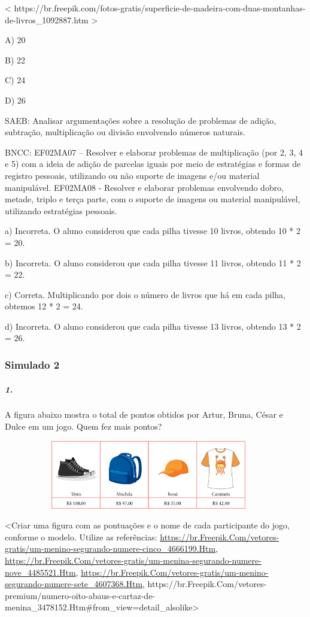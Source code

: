 \textless{}
https://br.freepik.com/fotos-gratis/superficie-de-madeira-com-duas-montanhas-de-livros\_1092887.htm
\textgreater{}

A) 20

B) 22

C) 24

D) 26

SAEB: Analisar argumentações sobre a resolução de problemas de
adição, subtração, multiplicação ou divisão envolvendo números naturais.

BNCC: EF02MA07 -- Resolver e elaborar problemas de multiplicação (por 2,
3, 4 e 5) com a ideia de adição de parcelas iguais por meio de
estratégias e formas de registro pessoais, utilizando ou não suporte de
imagens e/ou material manipulável. EF02MA08 - Resolver e elaborar
problemas envolvendo dobro, metade, triplo e terça parte, com o suporte
de imagens ou material manipulável, utilizando estratégias pessoais.

a) Incorreta. O aluno considerou que cada pilha tivesse 10 livros, obtendo 10 *
2 = 20.

b) Incorreta. O aluno considerou que cada pilha tivesse 11 livros, obtendo 11 *
2 = 22.

c) Correta. Multiplicando por dois o número de livros que há em cada
pilha, obtemos 12 * 2 = 24.

d) Incorreta. O aluno considerou que cada pilha tivesse 13 livros, obtendo 13 *
2 = 26.

\subsubsection{Simulado 2}\label{simulado-2}

\subparagraph{1. }\label{section-115}

A figura abaixo mostra o total de pontos obtidos por Artur, Bruna, César
e Dulce em um jogo. Quem fez mais pontos?

\includegraphics[width=5.00000in,height=1.17708in]{media/image125.png}

\textless{}Criar uma figura com as pontuações e o nome de cada
participante do jogo, conforme o modelo. Utilize as referências:
\href{https://br.freepik.com/vetores-gratis/um-menino-segurando-numere-cinco_4666199.htm}{https://br.Freepik.Com/vetores-gratis/um-menino-segurando-numere-cinco\_4666199.Htm},
\href{https://br.freepik.com/vetores-gratis/um-menina-segurando-numere-nove_4485521.htm}{https://br.Freepik.Com/vetores-gratis/um-menina-segurando-numere-nove\_4485521.Htm},
\href{https://br.freepik.com/vetores-gratis/um-menino-segurando-numere-sete_4607368.htm}{https://br.Freepik.Com/vetores-gratis/um-menino-segurando-numere-sete\_4607368.Htm},
https://br.Freepik.Com/vetores-premium/numero-oito-abaus-e-cartaz-de-menina\_3478152.Htm\#from\_view=detail\_alsolike\textgreater{}

